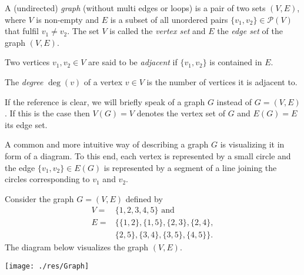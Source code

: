 \begin{defin}
\begin{thmlist}
\item A (undirected) \emph{graph} (without multi ed\-ges or loops) is a pair of two sets $(V,E)$, where $V$ is non-empty and $E$ is a subset of all unordered pairs $\lbrace v_1,v_2\rbrace\in\mathcal{P}(V)$ that fulfil $v_1\neq v_2$. The set $V$ is called the \emph{vertex set} and $E$ the \emph{edge set} of the graph $(V,E)$.
\item Two vertices $v_1,v_2\in V$ are said to be \emph{adjacent} if $\lbrace v_1,v_2\rbrace$ is contained in $E$.
\item The \emph{degree} $\deg(v)$ of a vertex $v\in V$ is the number of vertices it is adjacent to.
\end{thmlist}
\end{defin}


If the reference is clear, we will briefly speak of a graph $G$ instead of $G=(V,E)$. If this is the case then $V(G)=V$ denotes the vertex set of $G$ and $E(G)=E$ its edge set.

A common and more intuitive way of describing a graph $G$ is visualizing it in form of a diagram. To this end, each vertex is represented by a small circle and the edge $\lbrace v_1,v_2\rbrace\in E(G)$ is represented by a segment of a line joining the circles corresponding to $v_1$ and $v_2$.

\begin{exam}\label{ex:Graph}
Consider the graph $G=(V,E)$ defined by
\begin{align*}
V = &\lbrace 1,2,3,4,5\rbrace \text{ and}\\
E = &\lbrace\lbrace 1,2\rbrace, \lbrace 1, 5\rbrace, \lbrace 2, 3\rbrace, \lbrace 2, 4\rbrace, \\
 & \lbrace 2, 5 \rbrace, \lbrace 3, 4\rbrace, \lbrace 3, 5\rbrace, \lbrace 4, 5\rbrace\rbrace.
\end{align*}
The diagram below visualizes the graph $(V,E).$

\begin{center}
\texttt{[image: ./res/Graph]}
\end{center}
\end{exam}

